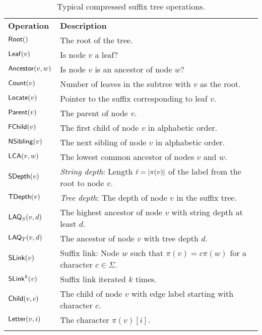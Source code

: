 \begin{table}
\centering{}
\caption{Typical compressed suffix tree operations.}\label{table:cst
operations}

\begin{tabular}{ll}
\hline
\noalign{\smallskip}
\textbf{Operation}  & \textbf{Description} \\
\noalign{\smallskip}
\hline
\noalign{\smallskip}
$\mathsf{Root}()$          & The root of the tree. \\
$\mathsf{Leaf}(v)$         & Is node $v$ a leaf? \\
$\mathsf{Ancestor}(v,w)$   & Is node $v$ is an ancestor of node $w$? \\
\noalign{\smallskip}
$\mathsf{Count}(v)$        & Number of leaves in the subtree with $v$ as the root. \\
$\mathsf{Locate}(v)$       & Pointer to the suffix corresponding to leaf $v$. \\
\noalign{\smallskip}
$\mathsf{Parent}(v)$       & The parent of node $v$. \\
$\mathsf{FChild}(v)$       & The first child of node $v$ in alphabetic order. \\
$\mathsf{NSibling}(v)$     & The next sibling of node $v$ in alphabetic order. \\
$\mathsf{LCA}(v,w)$        & The lowest common ancestor of nodes $v$ and $w$. \\
\noalign{\smallskip}
$\mathsf{SDepth}(v)$       & \emph{String depth}: Length $\ell = \lvert \pi(v) \rvert$ of the
label from the root to node $v$. \\
$\mathsf{TDepth}(v)$       & \emph{Tree depth}: The depth of node $v$ in the suffix
tree. \\
$\mathsf{LAQ}_{S}(v,d)$    & The highest ancestor of node $v$ with string depth at
least $d$. \\
$\mathsf{LAQ}_{T}(v,d)$    & The ancestor of node $v$ with tree depth $d$. \\
\noalign{\smallskip}
$\mathsf{SLink}(v)$        & Suffix link: Node $w$ such that $\pi(v) = c \pi(w)$ for
a character $c \in \Sigma$. \\
$\mathsf{SLink}^{k}(v)$    & Suffix link iterated $k$ times. \\
\noalign{\smallskip}
$\mathsf{Child}(v,c)$      & The child of node $v$ with edge label starting with
character $c$. \\
$\mathsf{Letter}(v,i)$     & The character $\pi(v)[i]$. \\
\noalign{\smallskip}
\hline
\end{tabular}
\end{table}

